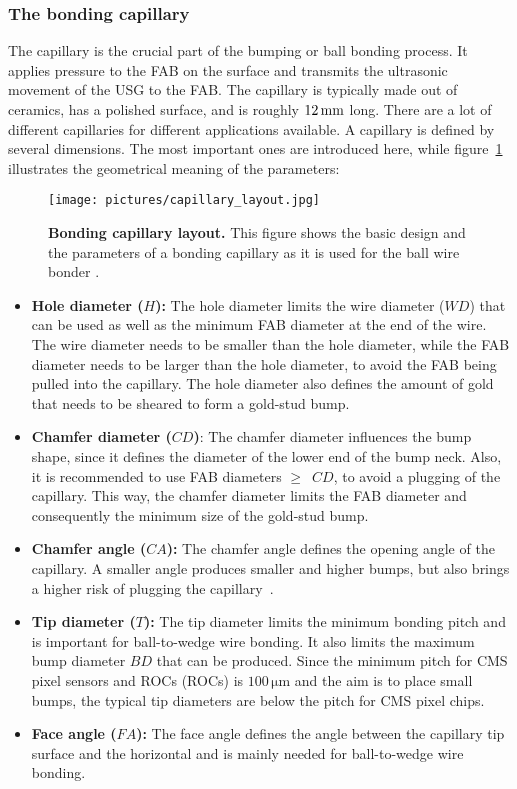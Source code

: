 \subsubsection{The bonding capillary}\label{sec:capillary}
The capillary is the crucial part of the bumping or ball bonding process. It applies pressure to the \ac{FAB} on the surface and transmits the ultrasonic movement of the \ac{USG} to the \ac{FAB}. The capillary is typically made out of ceramics, has a polished surface, and is roughly $12\,\rm{mm}$ long. There are a lot of different capillaries for different applications available. A capillary is defined by several dimensions. The most important ones are introduced here, while figure~\ref{fig:capillary_layout} illustrates the geometrical meaning of the parameters:
\begin{figure}
\begin{center}
\texttt{[image: pictures/capillary\_layout.jpg]}
\end{center}
\caption[Bonding capillary layout]{\textbf{Bonding capillary layout.} This figure shows the basic design and the parameters of a bonding capillary as it is used for the ball wire bonder \cite{Sma14a}.}\label{fig:capillary_layout}
\end{figure}
\begin{itemize}
\item \textbf{Hole diameter ($H$):} The hole diameter limits the wire diameter ($WD$) that can be used as well as the minimum \ac{FAB} diameter at the end of the wire. The wire diameter needs to be smaller than the hole diameter, while the \ac{FAB} diameter needs to be larger than the hole diameter, to avoid the \ac{FAB} being pulled into the capillary. The hole diameter also defines the amount of gold that needs to be sheared to form a gold-stud bump.
\item \textbf{Chamfer diameter ($CD$)}: The chamfer diameter influences the bump shape, since it defines the diameter of the lower end of the bump neck. Also, it is recommended to use \ac{FAB} diameters $\geq\,$ $CD$, to avoid a plugging of the capillary. This way, the chamfer diameter limits the \ac{FAB} diameter and consequently the minimum size of the gold-stud bump.
\item \textbf{Chamfer angle ($CA$):} The chamfer angle defines the opening angle of the capillary. A smaller angle produces smaller and higher bumps, but also brings a higher risk of plugging the capillary~\cite{Gri14}.
\item \textbf{Tip diameter ($T$):} The tip diameter limits the minimum bonding pitch and is important for ball-to-wedge wire bonding. It also limits the maximum bump diameter $BD$ that can be produced. Since the minimum pitch for \ac{CMS} pixel sensors and \acl{ROC}s (\acs{ROC}s) is $100\,\si{\micro \meter}$ and the aim is to place small bumps, the typical tip diameters are below the pitch for \ac{CMS} pixel chips.
\item \textbf{Face angle ($FA$):} The face angle defines the angle between the capillary tip surface and the horizontal and is mainly needed for ball-to-wedge wire bonding.
\end{itemize}
